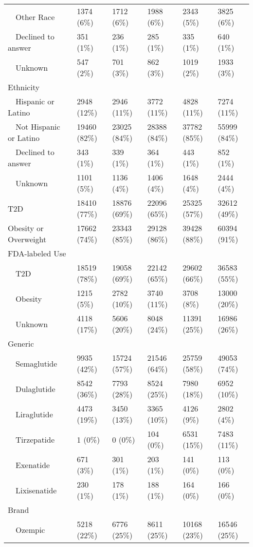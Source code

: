 \begin{longtable}{p{}p{}p{}p{}p{}p{}}
    Other Race & 1374 (6\%) & 1712 (6\%) & 1988 (6\%) & 2343 (5\%) & 3825 (6\%) \\ 
    Declined to answer & 351 (1\%) & 236 (1\%) & 285 (1\%) & 335 (1\%) & 640 (1\%) \\ 
    Unknown & 547 (2\%) & 701 (3\%) & 862 (3\%) & 1019 (2\%) & 1933 (3\%) \\ 
  Ethnicity &  &  &  &  &  \\ 
    Hispanic or Latino & 2948 (12\%) & 2946 (11\%) & 3772 (11\%) & 4828 (11\%) & 7274 (11\%) \\ 
    Not Hispanic or Latino & 19460 (82\%) & 23025 (84\%) & 28388 (84\%) & 37782 (85\%) & 55999 (84\%) \\ 
    Declined to answer & 343 (1\%) & 339 (1\%) & 364 (1\%) & 443 (1\%) & 852 (1\%) \\ 
    Unknown & 1101 (5\%) & 1136 (4\%) & 1406 (4\%) & 1648 (4\%) & 2444 (4\%) \\ 
  T2D & 18410 (77\%) & 18876 (69\%) & 22096 (65\%) & 25325 (57\%) & 32612 (49\%) \\ 
  Obesity or Overweight & 17662 (74\%) & 23343 (85\%) & 29128 (86\%) & 39428 (88\%) & 60394 (91\%) \\ 
  FDA-labeled Use &  &  &  &  &  \\ 
    T2D & 18519 (78\%) & 19058 (69\%) & 22142 (65\%) & 29602 (66\%) & 36583 (55\%) \\ 
    Obesity & 1215 (5\%) & 2782 (10\%) & 3740 (11\%) & 3708 (8\%) & 13000 (20\%) \\ 
    Unknown & 4118 (17\%) & 5606 (20\%) & 8048 (24\%) & 11391 (25\%) & 16986 (26\%) \\ 
  Generic &  &  &  &  &  \\ 
    Semaglutide & 9935 (42\%) & 15724 (57\%) & 21546 (64\%) & 25759 (58\%) & 49053 (74\%) \\ 
    Dulaglutide & 8542 (36\%) & 7793 (28\%) & 8524 (25\%) & 7980 (18\%) & 6952 (10\%) \\ 
    Liraglutide & 4473 (19\%) & 3450 (13\%) & 3365 (10\%) & 4126 (9\%) & 2802 (4\%) \\ 
    Tirzepatide & 1 (0\%) & 0 (0\%) & 104 (0\%) & 6531 (15\%) & 7483 (11\%) \\ 
    Exenatide & 671 (3\%) & 301 (1\%) & 203 (1\%) & 141 (0\%) & 113 (0\%) \\ 
    Lixisenatide & 230 (1\%) & 178 (1\%) & 188 (1\%) & 164 (0\%) & 166 (0\%) \\ 
  Brand &  &  &  &  &  \\ 
    Ozempic & 5218 (22\%) & 6776 (25\%) & 8611 (25\%) & 10168 (23\%) & 16546 (25\%) \\ 

\end{longtable}
